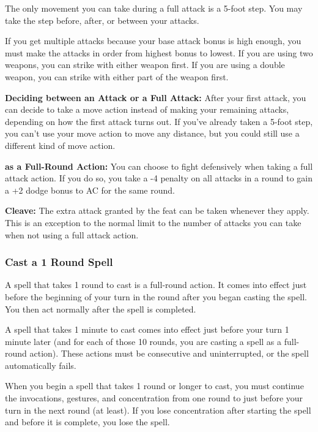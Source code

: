 The only movement you can take during a full attack is a 5-foot step. You may take the step before, after, or between your attacks.

If you get multiple attacks because your base attack bonus is high enough, you must make the attacks in order from highest bonus to lowest. If you are using two weapons, you can strike with either weapon first. If you are using a double weapon, you can strike with either part of the weapon first.

\textbf{Deciding between an Attack or a Full Attack:} After your first attack, you can decide to take a move action instead of making your remaining attacks, depending on how the first attack turns out. If you've already taken a 5-foot step, you can't use your move action to move any distance, but you could still use a different kind of move action.

\textbf{ as a Full-Round Action:} You can choose to fight defensively when taking a full attack action. If you do so, you take a -4 penalty on all attacks in a round to gain a +2 dodge bonus to AC for the same round.

\textbf{Cleave:} The extra attack granted by the  feat can be taken whenever they apply. This is an exception to the normal limit to the number of attacks you can take when not using a full attack action.

\subsubsection{Cast a 1 Round Spell}

A spell that takes 1 round to cast is a full-round action. It comes into effect just before the beginning of your turn in the round after you began casting the spell. You then act normally after the spell is completed.

A spell that takes 1 minute to cast comes into effect just before your turn 1 minute later (and for each of those 10 rounds, you are casting a spell as a full-round action). These actions must be consecutive and uninterrupted, or the spell automatically fails.

When you begin a spell that takes 1 round or longer to cast, you must continue the invocations, gestures, and concentration from one round to just before your turn in the next round (at least). If you lose concentration after starting the spell and before it is complete, you lose the spell.

